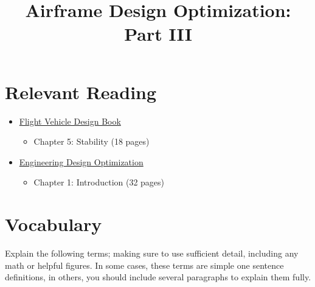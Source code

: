 \documentclass[11pt]{article}
\title{Airframe Design Optimization: Part III}
\date{}
\begin{document}
	
\maketitle
\vspace{-2cm}
	
\section*{Relevant Reading}
\label{sec:reading}

\begin{itemize}
	\item \href{http://flowlab.groups.et.byu.net/me415/flight.pdf}{Flight Vehicle Design Book}
	\begin{itemize}
		\item Chapter 5: Stability (18 pages)
	\end{itemize}
	\item \href{http://flowlab.groups.et.byu.net/mdobook.pdf}{Engineering Design Optimization} 
	\begin{itemize}
		\item Chapter 1: Introduction (32 pages)
	\end{itemize}
\end{itemize}



\section{Vocabulary}
\label{sec:vocab}

Explain the following terms; making sure to use sufficient detail, including any math or helpful figures.
In some cases, these terms are simple one sentence definitions, in others, you should include several paragraphs to explain them fully.
\end{document}
